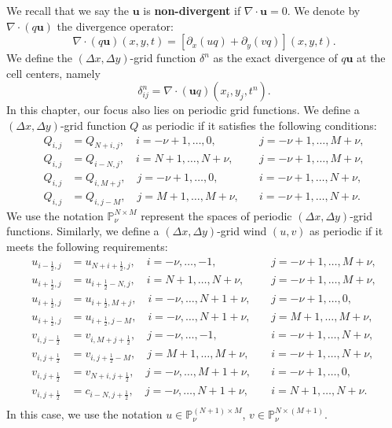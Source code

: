 We recall that we say the $\boldsymbol{u}$ is \textbf{non-divergent} if $\nabla \cdot \boldsymbol{u}=0$.
We denote by $\nabla \cdot (q\boldsymbol{u})$ the divergence operator:
\begin{equation}
	\label{sec-adv2d:eqdiv}
	\nabla \cdot (q\boldsymbol{u})(x, y, t) =  
	[{\partial_x (uq)} + {\partial_y (vq)}](x, y, t).
\end{equation}
We define the $(\Delta x, \Delta y)$-grid function $\delta^n$ as
the exact divergence of $q\boldsymbol{u}$ at the cell centers, namely
\begin{equation}
\label{2d-discrete-div}
\delta^n_{ij} = \nabla \cdot (\boldsymbol{u}q)(x_i,y_j,t^n).
\end{equation}
In this chapter, our focus also lies on periodic grid functions.
We define a $(\Delta x, \Delta y)$-grid function $Q$ as periodic if it satisfies the following conditions:
\begin{align*}
    Q_{i,j} &= Q_{N+i,j}, \quad i=-\nu+1, \ldots, 0,  \quad &j = -\nu+1, \ldots, M+\nu,\\
    Q_{i,j} &= Q_{i-N,j}, \quad i=N+1, \ldots, N+\nu, \quad &j = -\nu+1, \ldots, M+\nu,\\
    Q_{i,j} &= Q_{i,M+j}, \quad j=-\nu+1, \ldots, 0,  \quad &i = -\nu+1, \ldots, N+\nu,\\
    Q_{i,j} &= Q_{i,j-M}, \quad j=M+1, \ldots, M+\nu, \quad &i = -\nu+1, \ldots, N+\nu.
\end{align*}
We use the notation $\mathbb{P}^{N \times M}_{\nu}$ represent the spaces of periodic $(\Delta x, \Delta y)$-grid functions.
Similarly, we define a $(\Delta x, \Delta y)$-grid wind $(u,v)$ as periodic if it meets the following requirements:
\begin{align*}
    u_{i-\frac{1}{2},j} &= u_{N+i+\frac{1}{2},j} , \quad i=-\nu, \ldots, -1,   \quad &j = -\nu+1, \ldots, M+\nu,\\
    u_{i+\frac{1}{2},j} &= u_{i+\frac{1}{2}-N,j} , \quad i=N+1, \ldots, N+\nu, \quad &j = -\nu+1, \ldots, M+\nu,\\
    u_{i+\frac{1}{2},j} &= u_{i+\frac{1}{2},M+j} , \quad i=-\nu, \ldots, N+1+\nu,   \quad &j = -\nu+1, \ldots, 0,\\
    u_{i+\frac{1}{2},j} &= u_{i+\frac{1}{2},j-M} , \quad i=-\nu, \ldots, N+1+\nu,   \quad &j = M+1, \ldots, M+\nu,\\
    v_{i,j-\frac{1}{2}} &= v_{i,M+j+\frac{1}{2}} , \quad j=-\nu, \ldots, -1,   \quad &i = -\nu+1, \ldots, N+\nu,\\
    v_{i,j+\frac{1}{2}} &= v_{i,j+\frac{1}{2}-M} , \quad j=M+1, \ldots, M+\nu, \quad &i = -\nu+1, \ldots, N+\nu,\\
    v_{i,j+\frac{1}{2}} &= v_{N+i,j+\frac{1}{2}} , \quad j=-\nu, \ldots, M+1+\nu,   \quad &i = -\nu+1, \ldots, 0,\\
    v_{i,j+\frac{1}{2}} &= c_{i-N,j+\frac{1}{2}} , \quad j=-\nu, \ldots, N+1+\nu,   \quad &i = N+1, \ldots, N+\nu.\\
\end{align*}
In this case, we use the notation $u \in \mathbb{P}^{(N+1) \times M}_{\nu}$, 
$v \in \mathbb{P}^{N \times (M+1)}_{\nu}$.

